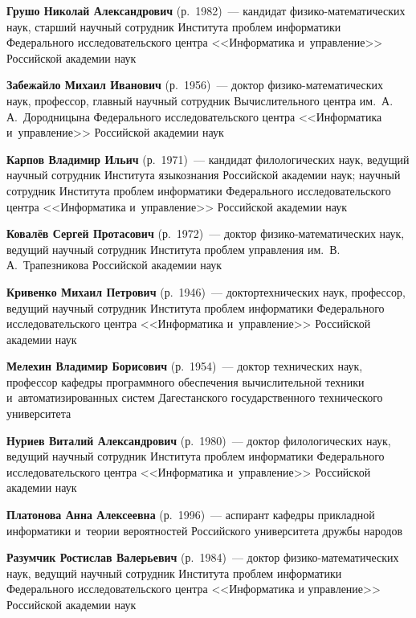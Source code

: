 \begin{multicols}{2}
\noindent
\textbf{Грушо Николай Александрович} (р.\ 1982)~--- кандидат фи\-зи\-ко-ма\-те\-ма\-ти\-че\-ских наук, 
старший научный сотрудник Института проб\-лем информатики Федерального исследовательского цент\-ра <<Информатика и~управ\-ле\-ние>> Российской академии наук

\noindent
\textbf{Забежайло Михаил Иванович} (р.\ 1956)~--- доктор фи\-зи\-ко-ма\-те\-ма\-ти\-че\-ских наук, 
профессор, главный научный сотрудник Вычислительного цент\-ра им.\ А.\,А.~Дородницына Федерального исследовательского цент\-ра 
<<Информатика и~управ\-ле\-ние>> Российской академии наук

\noindent
\textbf{Карпов Владимир Ильич} (р.\ 1971)~--- кандидат филологических наук, 
ведущий научный сотрудник Института языкознания Российской академии наук; научный сотрудник Института проб\-лем 
информатики Федерального исследовательского цент\-ра <<Информатика и~управ\-ле\-ние>> Российской академии наук

\noindent
\textbf{Ковалёв Сергей Протасович} (р.\ 1972)~--- 
доктор фи\-зи\-ко-ма\-те\-ма\-ти\-че\-ских наук, ведущий научный сотрудник Института проб\-лем управ\-ле\-ния 
им.\ В.\,А.~Трапезникова Российской академии наук

\noindent
\textbf{Кривенко Михаил Петрович} (р.\ 1946)~--- 
доктор\linebreak технических наук, профессор, ведущий научный сотрудник Института проб\-лем информатики 
Федерального исследовательского цент\-ра <<Информатика и~управ\-ле\-ние>> Российской академии наук

\noindent
\textbf{Мелехин Владимир Борисович} (р.\ 1954)~--- 
доктор технических наук, профессор кафедры про\-грам\-мно\-го обеспечения вычислительной техники и~автоматизированных сис\-тем 
Дагестанского государственного технического университета

\noindent
\textbf{Нуриев Виталий Александрович} (р.\ 1980)~--- 
доктор филологических наук, ведущий научный сотрудник Института проб\-лем информатики \mbox{Федерального} исследовательского цент\-ра 
<<Информатика и~управ\-ле\-ние>> Российской академии наук

\noindent
\textbf{Платонова Анна Алексеевна} (р.\ 1996)~--- 
аспирант кафедры прикладной информатики и~тео\-рии вероятностей Российского университета друж\-бы народов

\noindent
\textbf{Разумчик Ростислав Валерьевич} (р.\ 1984)~--- доктор фи\-зи\-ко-ма\-те\-ма\-ти\-че\-ских наук, 
ведущий научный сотрудник Института проблем информатики
Федерального исследовательского центра <<Информатика и управление>> Российской академии наук


\end{multicols}

